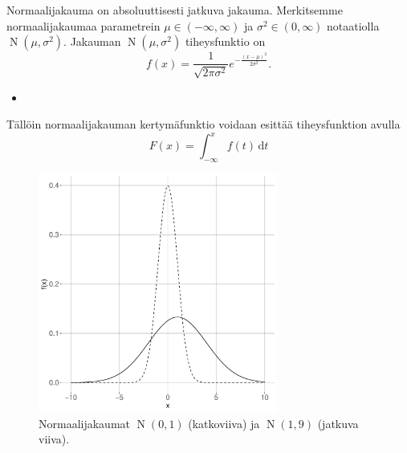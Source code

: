 \documentclass{beamer}
\DeclareMathOperator{\n}{\mathrm N}
\begin{document}
\begin{frame}
  Normaalijakauma on absoluuttisesti jatkuva jakauma. Merkitsemme
  normaalijakaumaa parametrein $\mu\in(-\infty, \infty)$ ja
  $\sigma^2\in(0,\infty)$ notaatiolla $\n\left(\mu, \sigma^2\right)$. Jakauman
  $\n\left(\mu, \sigma^2\right)$ tiheysfunktio on
  \begin{equation*}
    f(x) = \frac{1}{\sqrt{2\pi\sigma^2}} e^{-\frac{\left(x-\mu\right)^2}
    {2\sigma^2}}.
  \end{equation*}
  \pause
  \begin{itemize}
    \item[]
  \end{itemize}
  Tällöin normaalijakauman kertymäfunktio voidaan esittää tiheysfunktion avulla
  \begin{equation*}
    F\left(x\right) = \int_{-\infty}^{x} f(t)\,\mathrm{d}t
  \end{equation*}
\end{frame}


\begin{frame}
  \begin{center}
    \begin{figure}
      \includegraphics[width=0.7\textwidth, height=0.7\textwidth]{normal}
      \caption{Normaalijakaumat $\n\left(0,1\right)$ (katkoviiva) ja $\n\left(1, 9\right)$ (jatkuva viiva).}
    \end{figure}
  \end{center}
\end{frame}

\end{document}
